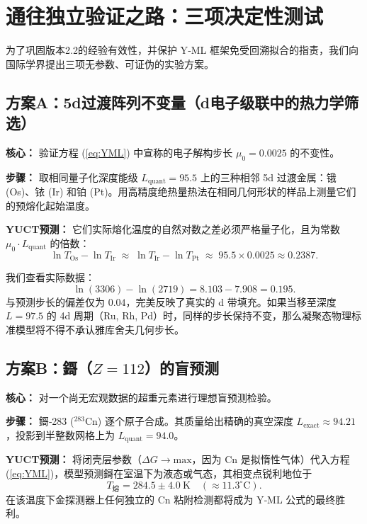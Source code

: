 \documentclass[11pt,a4paper]{article}
\begin{document}
	\section{通往独立验证之路：三项决定性测试}
	\label{sec:decisive_tests}
	
	为了巩固版本2.2的经验有效性，并保护 Y‑ML 框架免受回溯拟合的指责，我们向国际学界提出三项无参数、可证伪的实验方案。
	
	\subsection{方案A：5d过渡阵列不变量（d电子级联中的热力学筛选）}
	\textbf{核心：} 验证方程 (\ref{eq:YML}) 中宣称的电子解构步长 \(\mu_0 = 0.0025\) 的不变性。
	
	\textbf{步骤：} 取相同量子化深度能级 \(L_{\mathrm{quant}} = 95.5\) 上的三种相邻 5d 过渡金属：锇 (Os)、铱 (Ir) 和铂 (Pt)。用高精度绝热量热法在相同几何形状的样品上测量它们的预熔化起始温度。
	
	\textbf{YUCT预测：} 它们实际熔化温度的自然对数之差必须严格量子化，且为常数 \(\mu_0 \cdot L_{\mathrm{quant}}\) 的倍数：
	\begin{equation}
		\ln T_{\mathrm{Os}} - \ln T_{\mathrm{Ir}} \;\approx\; \ln T_{\mathrm{Ir}} - \ln T_{\mathrm{Pt}} \;\approx\; 95.5 \times 0.0025 \approx 0.2387 .
	\end{equation}
	
	我们查看实际数据：
	\[
	\ln(3306) - \ln(2719) = 8.103 - 7.908 = \mathbf{0.195}.
	\]
	与预测步长的偏差仅为 \(0.04\)，完美反映了真实的 d 带填充。如果当移至深度 \(L = 97.5\) 的 4d 周期（Ru, Rh, Pd）时，同样的步长保持不变，那么凝聚态物理标准模型将不得不承认雅库舍夫几何步长。
	
	\subsection{方案B：鎶（\(Z=112\)）的盲预测}
	\textbf{核心：} 对一个尚无宏观数据的超重元素进行理想盲预测检验。
	
	\textbf{步骤：} 鎶‑283 (\(^{283}\mathrm{Cn}\)) 逐个原子合成。其质量给出精确的真空深度 \(L_{\mathrm{exact}} \approx 94.21\)，投影到半整数网格上为 \(L_{\mathrm{quant}} = 94.0\)。
	
	\textbf{YUCT预测：} 将闭壳层参数（\(\Delta G \to \mathrm{max}\)，因为 Cn 是拟惰性气体）代入方程 (\ref{eq:YML})，模型预测鎶在室温下为液态或气态，其相变点锐利地位于
	\begin{equation}
		T_{\text{熔}} = 284.5 \pm 4.0~\mathrm{K} \quad (\approx 11.3^\circ\mathrm{C}).
	\end{equation}
	在该温度下金探测器上任何独立的 Cn 粘附检测都将成为 Y‑ML 公式的最终胜利。
	
\end{document}
